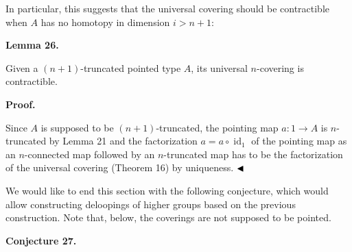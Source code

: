 \documentclass[10pt,a4paper]{article}
\begin{document}
 
 
 
In particular, this suggests that the universal covering should be contractible when $A$ has no homotopy in dimension $i>n+1$:\par
 
 
 
\par\medskip\noindent\textbf{Lemma 26.}\par
 
 
Given a $(n{+}1)$-truncated pointed type $A$, its universal $n$-covering is contractible.\par
 
 
 
 
 
\par\medskip\noindent\textbf{Proof.}\par
 
 
Since $A$ is supposed to be $(n{+}1)$-truncated, the pointing map $a:1\to A$ is $n$-truncated by Lemma 21 and the factorization $a=a\circ\operatorname{id}_{1}$ of the pointing map as an $n$-connected map followed by an $n$-truncated map has to be the factorization of the universal covering (Theorem 16) by uniqueness. $\hfill\blacktriangleleft$\par
 
 
 
We would like to end this section with the following conjecture, which would allow constructing deloopings of higher groups based on the previous construction. Note that, below, the coverings are not supposed to be pointed.\par
 
 
 
\par\medskip\noindent\textbf{Conjecture 27.}\par
 
\end{document}
